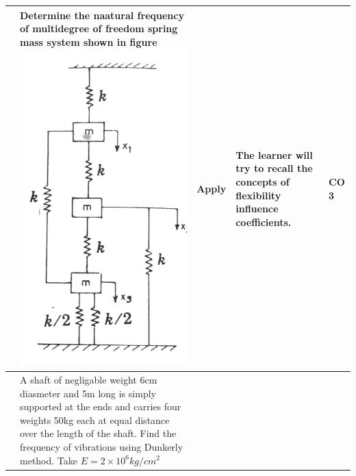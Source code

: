\documentclass[11pt,paper=a4,answers]{exam}
\begin{document}
\begin{flushleft}
\begin{longtable}{|>{\centering\arraybackslash}p{0.8cm}  | >{\raggedright\arraybackslash}p{6.5cm}  | c | >{\raggedright\arraybackslash}p{5cm} |>{\centering\arraybackslash}p{1cm}|}
	2&	Determine the naatural frequency of multidegree of freedom spring mass system shown in figure \includegraphics[scale=0.3]{6_3.png}
&	Apply&	The learner will try to \textbf{recall} the concepts of flexibility influence coefficients.&	CO 3\\
	\hline
	3&	A shaft of negligable weight 6cm diasmeter and 5m long is simply supported at the ends and carries four weights 50kg each at equal distance over the length of the shaft. Find the frequency of vibrations using Dunkerly method. Take $E=2 \times 10^{6}kg/cm^{2}$
	

\end{longtable}
\end{flushleft}
\end{document}
